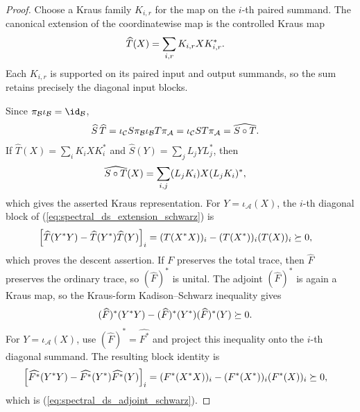\begin{proof}\leanok
    Choose a Kraus family $K_{i,r}$ for the map on the $i$-th paired
    summand. The canonical extension of the coordinatewise map is the
    controlled Kraus map
    \begin{align}
        \widehat T(X)
        &=\sum_{i,r}K_{i,r}XK_{i,r}^*.
        \notag
    \end{align}
    Each $K_{i,r}$ is supported on its paired input and output summands, so
    the sum retains precisely the diagonal input blocks.

    Since $\pi_{\mathcal B}\iota_{\mathcal B}=\id_{\mathcal B}$,
    \begin{align}
        \widehat S\,\widehat T
         & =\iota_{\mathcal C}S\pi_{\mathcal B}
        \iota_{\mathcal B}T\pi_{\mathcal A}
        =\iota_{\mathcal C}ST\pi_{\mathcal A}
        =\widehat{S\circ T}.
        \notag
    \end{align}
    If $\widehat T(X)=\sum_iK_iXK_i^*$ and $\widehat S(Y)=\sum_jL_jYL_j^*$, then
    \begin{align}
        \widehat{S\circ T}(X)
         & =\sum_{i,j}(L_jK_i)X(L_jK_i)^*,
        \notag
    \end{align}
    which gives the asserted Kraus representation. For $Y=\iota_{\mathcal A}(X)$, the $i$-th diagonal block of
    (\ref{eq:spectral_ds_extension_schwarz}) is
    \begin{align}
        \left[\widehat T(Y^*Y)
            -\widehat T(Y^*)\widehat T(Y)\right]_i
         & =(T(X^*X))_i-(T(X^*))_i(T(X))_i
        \succeq0,
        \notag
    \end{align}
    which proves the descent assertion. If $F$ preserves the total trace, then $\widehat F$ preserves the ordinary trace, so $(\widehat F)^*$ is
    unital. The adjoint $(\widehat F)^*$ is again a Kraus map, so the
    Kraus-form Kadison--Schwarz inequality gives
    \begin{align}
        (\widehat F)^*(Y^*Y)
        -(\widehat F)^*(Y^*)(\widehat F)^*(Y)
         & \succeq0.
        \notag
    \end{align}
    For $Y=\iota_{\mathcal A}(X)$, use $(\widehat F)^*=\widehat{F^*}$ and project this inequality onto the
    $i$-th diagonal summand. The resulting block identity is
    \begin{align}
        \left[\widehat{F^*}(Y^*Y)
            -\widehat{F^*}(Y^*)\widehat{F^*}(Y)\right]_i
         & =(F^*(X^*X))_i-(F^*(X^*))_i(F^*(X))_i
        \succeq0,
        \notag
    \end{align}
    which is (\ref{eq:spectral_ds_adjoint_schwarz}).
\end{proof}


